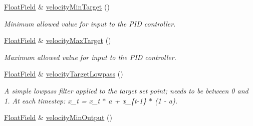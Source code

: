 \begin{DoxyCompactItemize}
\mbox{\label{classhebi_1_1Command_1_1Settings_1_1Actuator_1_1VelocityGains_a8e08b9592e6a33c54e35267b8fb1e2a2}} 
\hyperlink{classhebi_1_1Command_1_1FloatField}{Float\+Field} \& \hyperlink{classhebi_1_1Command_1_1Settings_1_1Actuator_1_1VelocityGains_a8e08b9592e6a33c54e35267b8fb1e2a2}{velocity\+Min\+Target} ()
\begin{DoxyCompactList}\small\item\em Minimum allowed value for input to the P\+ID controller. \end{DoxyCompactList}\item 
\mbox{\label{classhebi_1_1Command_1_1Settings_1_1Actuator_1_1VelocityGains_a96dc827b032b71be332c02499e0d334d}} 
\hyperlink{classhebi_1_1Command_1_1FloatField}{Float\+Field} \& \hyperlink{classhebi_1_1Command_1_1Settings_1_1Actuator_1_1VelocityGains_a96dc827b032b71be332c02499e0d334d}{velocity\+Max\+Target} ()
\begin{DoxyCompactList}\small\item\em Maximum allowed value for input to the P\+ID controller. \end{DoxyCompactList}\item 
\mbox{\label{classhebi_1_1Command_1_1Settings_1_1Actuator_1_1VelocityGains_a32c98ce7977d7e0751aa272691552dae}} 
\hyperlink{classhebi_1_1Command_1_1FloatField}{Float\+Field} \& \hyperlink{classhebi_1_1Command_1_1Settings_1_1Actuator_1_1VelocityGains_a32c98ce7977d7e0751aa272691552dae}{velocity\+Target\+Lowpass} ()
\begin{DoxyCompactList}\small\item\em A simple lowpass filter applied to the target set point; needs to be between 0 and 1. At each timestep\+: x\+\_\+t = x\+\_\+t $\ast$ a + x\+\_\+\{t-\/1\} $\ast$ (1 -\/ a). \end{DoxyCompactList}\item 
\mbox{\label{classhebi_1_1Command_1_1Settings_1_1Actuator_1_1VelocityGains_aebc8db25cd3cb2756415953cf0d0a507}} 
\hyperlink{classhebi_1_1Command_1_1FloatField}{Float\+Field} \& \hyperlink{classhebi_1_1Command_1_1Settings_1_1Actuator_1_1VelocityGains_aebc8db25cd3cb2756415953cf0d0a507}{velocity\+Min\+Output} ()

\end{DoxyCompactItemize}
